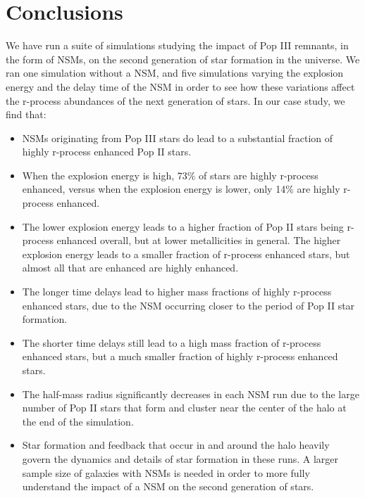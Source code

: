 \documentclass[fleqn,usenatbib]{mnras}
\begin{document}
\section{Conclusions} \label{sec:conclusion}

We have run a suite of simulations studying the impact of Pop III remnants, in the form of NSMs, on the second generation of star formation in the universe. We ran one simulation without a NSM, and five simulations varying the explosion energy and the delay time of the NSM in order to see how these variations affect the r-process abundances of the next generation of stars. In our case study, we find that:
\begin{itemize}
	\item NSMs originating from Pop III stars do lead to a substantial fraction of highly r-process enhanced Pop II stars.
	\item When the explosion energy is high, 73\% of stars are highly r-process enhanced, versus when the explosion energy is lower, only 14\% are highly r-process enhanced. 
	\item The lower explosion energy leads to a higher fraction of Pop II stars being r-process enhanced overall, but at lower metallicities in general. The higher explosion energy leads to a smaller fraction of r-process enhanced stars, but almost all that are enhanced are highly enhanced. 
	\item The longer time delays lead to higher mass fractions of highly r-process enhanced stars, due to the NSM occurring closer to the period of Pop II star formation. 
	\item The shorter time delays still lead to a high mass fraction of r-process enhanced stars, but a much smaller fraction of highly r-process enhanced stars.
	\item The half-mass radius significantly decreases in each NSM run due to the large number of Pop II stars that form and cluster near the center of the halo at the end of the simulation. 
	\item Star formation and feedback that occur in and around the halo heavily govern the dynamics and details of star formation in these runs. A larger sample size of galaxies with NSMs is needed in order to more fully understand the impact of a NSM on the second generation of stars. 
\end{itemize}
\end{document}

